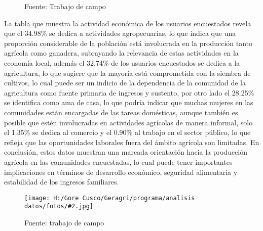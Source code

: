 \documentclass{article}\usepackage[]{graphicx}\usepackage[table]{xcolor}
\makeatletter
\newenvironment{kframe}{%
 \def\at@end@of@kframe{}%
 \ifinner\ifhmode%
  \def\at@end@of@kframe{\end{minipage}}%
  \begin{minipage}{\columnwidth}%
 \fi\fi%
 \def\FrameCommand##1{\hskip\@totalleftmargin \hskip-\fboxsep
 \colorbox{shadecolor}{##1}\hskip-\fboxsep
     \hskip-\linewidth \hskip-\@totalleftmargin \hskip\columnwidth}%
 \MakeFramed {\advance\hsize-\width
   \@totalleftmargin\z@ \linewidth\hsize
   \@setminipage}}%
 {\par\unskip\endMakeFramed%
 \at@end@of@kframe}
\newenvironment{knitrout}{}{} %
\newenvironment{fotos}[2]
{\begin{figure}[H]
	\centering
	\caption{#1}
	\texttt{[image: H:/Gore Cusco/Geragri/programa/analisis datos/fotos/\#2.jpg]}
	\caption*{Fuente: trabajo de campo}}
{\end{figure}}
\makeatother
\begin{document}
\begin{figure}[H]
  \centering
  \caption{Actividad economica a la que se dedica}
\begin{knitrout}
\color{fgcolor}\begin{kframe}


{\ttfamily\noindent\bfseries{}}

{\ttfamily\noindent{}}

{\ttfamily\noindent\bfseries{}}

{\ttfamily\noindent\bfseries\color{errorcolor}{\#\# Error: objeto 'datos' no encontrado}}

{\ttfamily\noindent\bfseries\color{errorcolor}{\#\# Error: objeto 'datos' no encontrado}}

{\ttfamily\noindent\bfseries\color{errorcolor}{\#\# Error: objeto 'datos' no encontrado}}

{\ttfamily\noindent\bfseries\color{errorcolor}{\#\# Error: objeto 'graph1' no encontrado}}\end{kframe}
\end{knitrout}
  \caption*{Fuente: Trabajo de campo}
\end{figure}
La tabla que muestra la actividad económica de los usuarios encuestados revela que el 34.98\% se dedica a actividades agropecuarias, lo que indica que una proporción considerable de la población está involucrada en la producción tanto agrícola como ganadera, subrayando la relevancia de estas actividades en la economía local, además el 32.74\% de los usuarios encuestados se dedica a la agricultura, lo que sugiere que la mayoría está comprometida con la siembra de cultivos, lo cual puede ser un indicio de la dependencia de la comunidad de la agricultura como fuente primaria de ingresos y sustento, por otro lado el 28.25\% se identifica como ama de casa, lo que podría indicar que muchas mujeres en las comunidades están encargadas de las tareas domésticas, aunque también es posible que estén involucradas en actividades agrícolas de manera informal, solo el 1.35\% se dedica al comercio y el 0.90\% al trabajo en el sector público, lo que refleja que las oportunidades laborales fuera del ámbito agrícola son limitadas. En conclusión, estos datos muestran una marcada orientación hacia la producción agrícola en las comunidades encuestadas, lo cual puede tener importantes implicaciones en términos de desarrollo económico, seguridad alimentaria y estabilidad de los ingresos familiares.
\begin{fotos}
{Aplicacion de encuestas en el area de influencia}{6}
\end{fotos}
\end{document}
